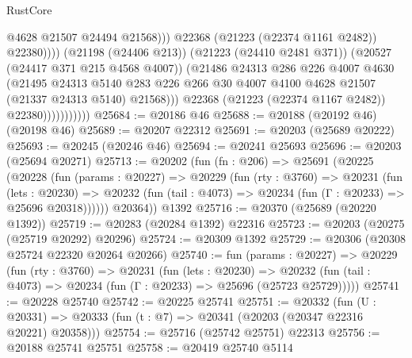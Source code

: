 \begin{lexlean}{RustCore}
\begin{coremodule}
                                          @4628
                                          @21507
                                          @24494
                                          @21568)))
                                    @22368
                                    (@21223 (@22374 @1161 @2482))
                                    @22380))))
                            (@21198 (@24406 @213))
                            (@21223 (@24410 @2481 @371))
                            (@20527 (@24417 @371 @215 @4568 @4007))
                            (@21486
                              @24313
                              @286
                              @226
                              @4007
                              @4630
                              (@21495
                                @24313
                                @5140
                                @283
                                @226
                                @266
                                @30
                                @4007
                                @4100
                                @4628
                                @21507
                                (@21337 @24313 @5140)
                                @21568)))
                          @22368
                          (@21223 (@22374 @1167 @2482))
                          @22380)))))))))))
@25684 := @20186 @46
@25688 := @20188 (@20192 @46) (@20198 @46)
@25689 := @20207 @22312
@25691 := @20203 (@25689 @20222)
@25693 := @20245 (@20246 @46)
@25694 := @20241 @25693
@25696 := @20203 (@25694 @20271)
@25713 := @20202
    (fun (fn : @206) =>
    @25691
      (@20225
        (@20228
          (fun (params : @20227) =>
          @20229
            (fun (rty : @3760) =>
            @20231
              (fun (lets : @20230) =>
              @20232 (fun (tail : @4073) => @20234 (fun (Γ : @20233) => @25696 @20318))))))
        @20364))
    @1392
@25716 := @20370 (@25689 (@20220 @1392))
@25719 := @20283 (@20284 @1392) @22316
@25723 := @20203 (@20275 (@25719 @20292) @20296)
@25724 := @20309 @1392
@25729 := @20306 (@20308 @25724 @22320 @20264 @20266)
@25740 := fun (params : @20227) =>
  @20229
    (fun (rty : @3760) =>
    @20231
      (fun (lets : @20230) =>
      @20232 (fun (tail : @4073) => @20234 (fun (Γ : @20233) => @25696 (@25723 @25729)))))
@25741 := @20228 @25740
@25742 := @20225 @25741
@25751 := @20332
    (fun (U : @20331) => @20333 (fun (t : @7) => @20341 (@20203 (@20347 @22316 @20221) @20358)))
@25754 := @25716 (@25742 @25751) @22313
@25756 := @20188 @25741 @25751
@25758 := @20419 @25740 @5114

\end{coremodule}
\end{lexlean}
